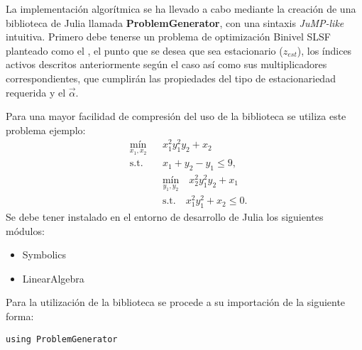 La implementación algorítmica se ha llevado a cabo mediante la creación de una biblioteca de Julia
llamada \textbf{ProblemGenerator}, con una sintaxis \textit{JuMP-like} intuitiva.
Primero debe tenerse un problema de optimización Binivel SLSF planteado como el , el punto que se desea que sea estacionario ($z_{est}$), los índices activos descritos anteriormente 
según el caso así como sus multiplicadores correspondientes, que cumplirán las propiedades del tipo de estacionariedad requerida y el $\vec{\alpha}$.

Para una mayor facilidad de compresión del uso de la biblioteca se utiliza este problema ejemplo:
\begin{equation}
    \begin{aligned}
        & \underset{x_1, x_2}{\text{mín}} 
        && x_1^2 y_1^2 y_2 + x_2 \\
        & \text{s.t.} 
        && x_1 + y_2 - y_1 \leq 9, \\
        & 
        && \underset{y_1, y_2}{\text{mín}} 
        \quad x_2^2 y_1^2 y_2 + x_1 \\
        & 
        && \text{s.t.} 
        \quad x_1^2 y_1^2 + x_2 \leq 0.
    \end{aligned}
    \label{ProblemaEjemplo}
\end{equation}
Se debe tener instalado en el entorno de desarrollo de Julia los siguientes módulos:
\begin{itemize}
    \item Symbolics 
    \item LinearAlgebra
\end{itemize}

Para la utilización de la biblioteca se procede a su importación de la siguiente forma:
\begin{lstlisting}[caption=Importar el Módulo]
    using ProblemGenerator
\end{lstlisting}


